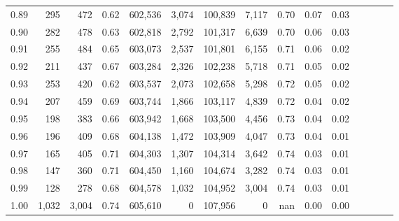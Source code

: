 \begin{tabular}{rrrcrrrrrrrrrrr}
0.89 &     295 &    472 &                                       0.62 &  602,536 &    3,074 &  100,839 &    7,117 &  0.70 &  0.07 &                         0.03 \\
0.90 &     282 &    478 &                                       0.63 &  602,818 &    2,792 &  101,317 &    6,639 &  0.70 &  0.06 &                         0.03 \\
0.91 &     255 &    484 &                                       0.65 &  603,073 &    2,537 &  101,801 &    6,155 &  0.71 &  0.06 &                         0.02 \\
0.92 &     211 &    437 &                                       0.67 &  603,284 &    2,326 &  102,238 &    5,718 &  0.71 &  0.05 &                         0.02 \\
0.93 &     253 &    420 &                                       0.62 &  603,537 &    2,073 &  102,658 &    5,298 &  0.72 &  0.05 &                         0.02 \\
0.94 &     207 &    459 &                                       0.69 &  603,744 &    1,866 &  103,117 &    4,839 &  0.72 &  0.04 &                         0.02 \\
0.95 &     198 &    383 &                                       0.66 &  603,942 &    1,668 &  103,500 &    4,456 &  0.73 &  0.04 &                         0.02 \\
0.96 &     196 &    409 &                                       0.68 &  604,138 &    1,472 &  103,909 &    4,047 &  0.73 &  0.04 &                         0.01 \\
0.97 &     165 &    405 &                                       0.71 &  604,303 &    1,307 &  104,314 &    3,642 &  0.74 &  0.03 &                         0.01 \\
0.98 &     147 &    360 &                                       0.71 &  604,450 &    1,160 &  104,674 &    3,282 &  0.74 &  0.03 &                         0.01 \\
0.99 &     128 &    278 &                                       0.68 &  604,578 &    1,032 &  104,952 &    3,004 &  0.74 &  0.03 &                         0.01 \\
1.00 &   1,032 &  3,004 &                                       0.74 &  605,610 &        0 &  107,956 &        0 &   nan &  0.00 &                         0.00 \\
\bottomrule
\end{tabular}

